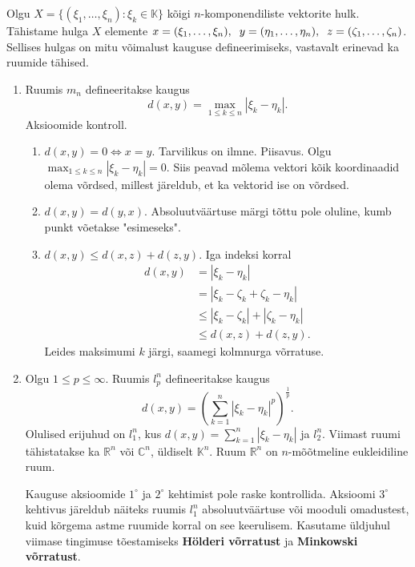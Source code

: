 \documentclass{article}[12pt]
\newcommand{\h}{\hspace{0.2cm}}
\newcommand{\R}{\mathbb{R}}
\newcommand{\K}{\mathbb{K}}
\newcommand{\C}{\mathbb{C}}
\theoremstyle{definition}
\theoremstyle{definition}
\theoremstyle{definition}
\theoremstyle{break}
\begin{document}
Olgu $X=\{(\xi_1,\dots,\xi_n): \xi_k\in\K\}$ kõigi $n$-komponendiliste vektorite hulk.
Tähistame hulga $X$ elemente $x=(\xi_1,\dots,\xi_n),\h y=(\eta_1,\dots,\eta_n),\h z=(\zeta_1,\dots,\zeta_n)$.
Sellises hulgas on mitu võimalust kauguse defineerimiseks, vastavalt erinevad ka ruumide tähised.
\begin{enumerate}
	\item Ruumis $m_n$ defineeritakse kaugus
	\[
		d(x,y) = \max_{1\leq k \leq n} |\xi_k-\eta_k|.
	\]
	Aksioomide kontroll.
	\begin{enumerate}
		\item $d(x,y) = 0 \Leftrightarrow x=y$.
		Tarvilikus on ilmne. 
		Piisavus. 
		Olgu $\max_{1\leq k \leq n} |\xi_k-\eta_k| = 0$. 
		Siis peavad mõlema vektori kõik koordinaadid olema võrdsed, millest järeldub, et ka vektorid ise on võrdsed.
		\item $d(x,y) = d(y,x)$.
		Absoluutväärtuse märgi tõttu pole oluline, kumb punkt võetakse "esimeseks".
		\item $d(x,y) \leq d(x,z) + d(z,y)$.
		Iga indeksi korral
		\begin{align*}
			d(x,y) &= |\xi_k-\eta_k| \\
			&= |\xi_k-\zeta_k+\zeta_k-\eta_k| \\
			&\leq |\xi_k-\zeta_k|+|\zeta_k-\eta_k| \\
			&\leq d(x,z) + d(z,y).
		\end{align*}
		Leides maksimumi $k$ järgi, saamegi kolmnurga võrratuse.
	\end{enumerate}
	\item Olgu $1\leq p \leq \infty$.
	Ruumis $l_p^n$ defineeritakse kaugus
	\[
		d(x,y) = \left( \sum_{k=1}^n |\xi_k - \eta_k|^p \right)^{\frac{1}{p}}.
	\]
	Olulised erijuhud on $l_1^n$, kus $d(x,y) = \sum_{k=1}^n |\xi_k-\eta_k|$ ja $l_2^n$.
	Viimast ruumi tähistatakse ka $\R^n$ või $\C^n$, üldiselt $\K^n$.
	Ruum $\R^n$ on $n$-mõõtmeline eukleidiline ruum.

	Kauguse aksioomide $1^\circ$ ja $2^\circ$ kehtimist pole raske kontrollida.
	Aksioomi $3^\circ$ kehtivus järeldub näiteks ruumis $l_1^n$ absoluutväärtuse või mooduli omadustest, kuid kõrgema astme ruumide korral on see keerulisem.
	Kasutame üldjuhul viimase tingimuse tõestamiseks \textbf{Hölderi võrratust} ja \textbf{Minkowski võrratust}.
\end{enumerate}
\end{document}
